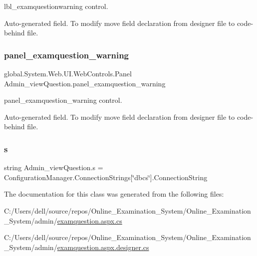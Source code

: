 lbl\+\_\+examquestionwarning control. 

Auto-\/generated field. To modify move field declaration from designer file to code-\/behind file. \mbox{\label{class_admin__view_question_ae154f3ebefb084c15b09d2bb6198bcf3}} 
\subsubsection{\texorpdfstring{panel\_examquestion\_warning}{panel\_examquestion\_warning}}
{\footnotesize\ttfamily global.\+System.\+Web.\+U\+I.\+Web\+Controls.\+Panel Admin\+\_\+view\+Question.\+panel\+\_\+examquestion\+\_\+warning\hspace{0.3cm}{\ttfamily [protected]}}



panel\+\_\+examquestion\+\_\+warning control. 

Auto-\/generated field. To modify move field declaration from designer file to code-\/behind file. \mbox{\label{class_admin__view_question_a79bad91cca34b62ba23dfae02f89b9ee}} 
\subsubsection{\texorpdfstring{s}{s}}
{\footnotesize\ttfamily string Admin\+\_\+view\+Question.\+s = Configuration\+Manager.\+Connection\+Strings\mbox{[}\char`\"{}dbcs\char`\"{}\mbox{]}.Connection\+String\hspace{0.3cm}{\ttfamily [private]}}



The documentation for this class was generated from the following files\+:\begin{DoxyCompactItemize}
\item 
C\+:/\+Users/dell/source/repos/\+Online\+\_\+\+Examination\+\_\+\+System/\+Online\+\_\+\+Examination\+\_\+\+System/admin/\mbox{\hyperlink{examquestion_8aspx_8cs}{examquestion.\+aspx.\+cs}}\item 
C\+:/\+Users/dell/source/repos/\+Online\+\_\+\+Examination\+\_\+\+System/\+Online\+\_\+\+Examination\+\_\+\+System/admin/\mbox{\hyperlink{examquestion_8aspx_8designer_8cs}{examquestion.\+aspx.\+designer.\+cs}}\end{DoxyCompactItemize}
